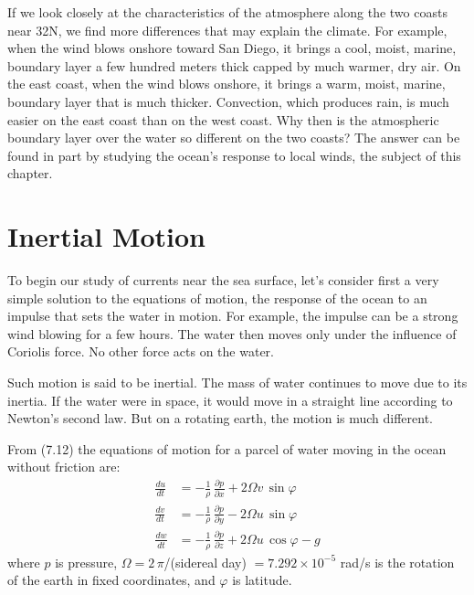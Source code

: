 If we look closely at the characteristics of the atmosphere along the two coasts
near 32\degrees N, we find more differences that may explain the
climate. For example, when the wind blows onshore toward San Diego, it brings a
cool, moist, marine, boundary layer a few hundred meters thick
capped by much warmer, dry air. On the east coast, when the wind blows onshore, it
brings a warm, moist, marine, boundary layer that is much thicker. Convection, which
produces rain, is much easier on the east coast than on the west coast. Why then is
the atmospheric boundary layer over the water so different on the two coasts? The
answer can be found in part by studying the ocean's response to local winds, the
subject of this chapter.

\section{Inertial Motion}
To begin our study of currents near the sea surface, let's
consider first a very simple solution to the equations of motion, the response of
the ocean to an impulse that sets the water in motion.  For example, the impulse
can be a strong wind blowing for a few hours. The water then moves only under the
influence of Coriolis force. No other force acts on the water.

Such motion is said to be inertial. The mass of water continues to move due to its
inertia. If the water were in space, it would move in a straight line according
to Newton's second law. But on a rotating earth, the motion is much
different.

From (7.12) the equations of motion for a parcel of water moving in the ocean without friction are:
\begin{subequations}
\begin{align}
\frac{du}{dt}&=-\frac{1}{\rho}\,\frac{\partial{p}}{\partial{x}} + 2\Omega v\,\sin\varphi \\
\frac{dv}{dt}&=-\frac{1}{\rho}\,\frac{\partial{p}}{\partial{y}} - 2\Omega u\,\sin\varphi \\
\frac{dw}{dt}&=-\frac{1}{\rho}\,\frac{\partial{p}}{\partial{z}} + 2\Omega u\,\cos\varphi - g
\end{align}
\end{subequations}
where $p$ is pressure, $\Omega = 2\,\pi$/(sidereal day) $= 7.292 \times 10^{-5}$
rad/s is the rotation of the earth in fixed coordinates, and $\varphi$ is
latitude.

